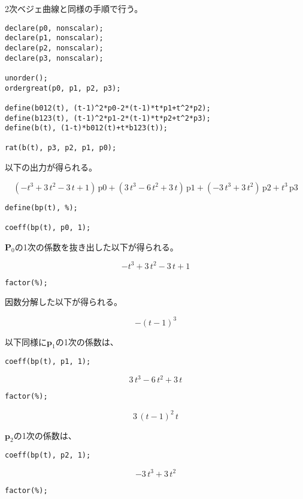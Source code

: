 \documentclass[dvipdfmx]{jsarticle}
\newcommand\VectBold[1]{\boldsymbol{#1}}
\newcommand\VectBold[1]{\symbf{#1}}
\newcommand\Vect[1]{\VectBold{#1}}
\begin{document}
2次ベジェ曲線と同様の手順で行う。

\begin{lstlisting}
declare(p0, nonscalar);
declare(p1, nonscalar);
declare(p2, nonscalar);
declare(p3, nonscalar);

unorder();
ordergreat(p0, p1, p2, p3);

define(b012(t), (t-1)^2*p0-2*(t-1)*t*p1+t^2*p2);
define(b123(t), (t-1)^2*p1-2*(t-1)*t*p2+t^2*p3);
define(b(t), (1-t)*b012(t)+t*b123(t));

rat(b(t), p3, p2, p1, p0);
\end{lstlisting}

以下の出力が得られる。

\[
\left(-t^3+3\,t^2-3\,t+1\right)\,\mathrm{p0}
+\left(3\,t^3-6\,t^2+3\,t\right)\,\mathrm{p1}
+\left(-3\,t^3+3\,t^2\right)\,\mathrm{p2}+t^3\,\mathrm{p3}
\]

\begin{lstlisting}
define(bp(t), %);

coeff(bp(t), p0, 1);
\end{lstlisting}

$\Vect{P}_0$の1次の係数を抜き出した以下が得られる。

\[
-t^3+3\,t^2-3\,t+1
\]

\begin{lstlisting}
factor(%);
\end{lstlisting}

因数分解した以下が得られる。

\[
-\left(t-1\right)^3
\]

以下同様に$\Vect{p}_1$の1次の係数は、

\begin{lstlisting}
coeff(bp(t), p1, 1);
\end{lstlisting}

\[
3\,t^3-6\,t^2+3\,t
\]

\begin{lstlisting}
factor(%);
\end{lstlisting}

\[
3\,\left(t-1\right)^2\,t
\]

$\Vect{p}_2$の1次の係数は、

\begin{lstlisting}
coeff(bp(t), p2, 1);
\end{lstlisting}

\[
-3\,t^3+3\,t^2
\]

\begin{lstlisting}
factor(%);
\end{lstlisting}
\end{document}
